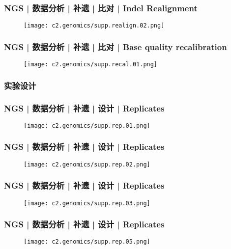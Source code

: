 \begin{frame}
  \frametitle{NGS | 数据分析 | 补遗 | 比对 | Indel Realignment}
  \begin{figure}
    \centering
    \texttt{[image: c2.genomics/supp.realign.02.png]}
  \end{figure}
\end{frame}

\begin{frame}
  \frametitle{NGS | 数据分析 | 补遗 | 比对 | Base quality recalibration}
  \begin{figure}
    \centering
    \texttt{[image: c2.genomics/supp.recal.01.png]}
  \end{figure}
\end{frame}

\subsubsection{实验设计}
\begin{frame}
  \frametitle{NGS | 数据分析 | 补遗 | 设计 | Replicates}
  \begin{figure}
    \centering
    \texttt{[image: c2.genomics/supp.rep.01.png]}
  \end{figure}
\end{frame}

\begin{frame}
  \frametitle{NGS | 数据分析 | 补遗 | 设计 | Replicates}
  \begin{figure}
    \centering
    \texttt{[image: c2.genomics/supp.rep.02.png]}
  \end{figure}
\end{frame}

\begin{frame}
  \frametitle{NGS | 数据分析 | 补遗 | 设计 | Replicates}
  \begin{figure}
    \centering
    \texttt{[image: c2.genomics/supp.rep.03.png]}
  \end{figure}
\end{frame}

\begin{frame}
  \frametitle{NGS | 数据分析 | 补遗 | 设计 | Replicates}
  \begin{figure}
    \centering
    \texttt{[image: c2.genomics/supp.rep.05.png]}
  \end{figure}
\end{frame}

